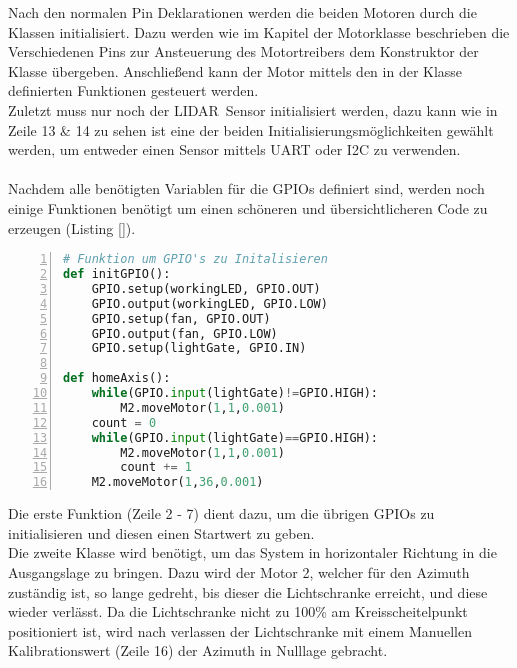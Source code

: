 Nach den normalen Pin Deklarationen werden die beiden Motoren durch die Klassen initialisiert. Dazu werden wie im Kapitel der Motorklasse beschrieben die Verschiedenen Pins zur Ansteuerung des Motortreibers dem Konstruktor der Klasse übergeben. Anschließend kann der Motor mittels den in der Klasse definierten Funktionen gesteuert werden.\\
Zuletzt muss nur noch der \ac{LIDAR} Sensor initialisiert werden, dazu kann wie in Zeile 13 \& 14 zu sehen ist eine der beiden Initialisierungsmöglichkeiten gewählt werden, um entweder einen Sensor mittels \ac{UART} oder \ac{I2C} zu verwenden.\\\\
Nachdem alle benötigten Variablen für die \acp{GPIO} definiert sind, werden noch einige Funktionen benötigt um einen schöneren und übersichtlicheren Code zu erzeugen (Listing \ref{}). 
\begin{lstlisting}[caption={Initialisieren von Variablen und Klassen}, language={Python}, label={main_classes}, numbers=left]
# Funktion um GPIO's zu Initalisieren
def initGPIO():
    GPIO.setup(workingLED, GPIO.OUT)
    GPIO.output(workingLED, GPIO.LOW)
    GPIO.setup(fan, GPIO.OUT)
    GPIO.output(fan, GPIO.LOW)
    GPIO.setup(lightGate, GPIO.IN)

def homeAxis():
    while(GPIO.input(lightGate)!=GPIO.HIGH):
        M2.moveMotor(1,1,0.001)
    count = 0
    while(GPIO.input(lightGate)==GPIO.HIGH):
        M2.moveMotor(1,1,0.001)
        count += 1
    M2.moveMotor(1,36,0.001)
\end{lstlisting}
Die erste Funktion (Zeile 2 - 7) dient dazu, um die übrigen \acp{GPIO} zu initialisieren und diesen einen Startwert zu geben. \\
Die zweite Klasse wird benötigt, um das System in horizontaler Richtung in die Ausgangslage zu bringen. Dazu wird der Motor 2, welcher für den Azimuth zuständig ist, so lange gedreht, bis dieser die Lichtschranke erreicht, und diese wieder verlässt. Da die Lichtschranke nicht zu 100\% am Kreisscheitelpunkt positioniert ist, wird nach verlassen der Lichtschranke mit einem Manuellen Kalibrationswert (Zeile 16) der Azimuth in Nulllage gebracht.
